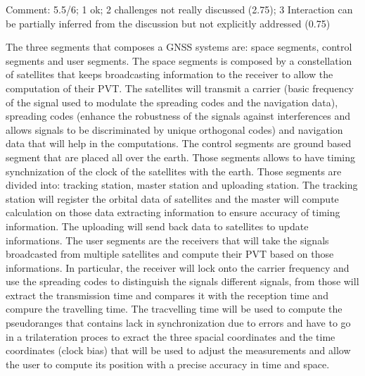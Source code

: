 \begin{solution}
    Comment: 5.5/6; 1 ok; 2 challenges not really discussed (2.75); 3 Interaction can be partially inferred from the discussion but not explicitly addressed (0.75)


    The three segments that composes a GNSS systems are: space segments, control segments and user segments. The space segments is composed by a constellation of satellites that keeps broadcasting information to the receiver to allow the computation of their PVT. The satellites will transmit a carrier (basic frequency of the signal used to modulate the spreading codes and the navigation data), spreading codes (enhance the robustness of the signals against interferences and allows signals to be discriminated by unique orthogonal codes) and navigation data that will help in the computations. The control segments are ground based segment that are placed all over the earth. Those segments allows to have timing synchnization of the clock of the satellites with the earth. Those segments are divided into: tracking station, master station and uploading station. The tracking station will register the orbital data of satellites and the master will compute calculation on those data extracting information to ensure accuracy of timing information. The uploading will send back data to satellites to update informations. The user segments are the receivers that will take the signals broadcasted from multiple satellites and compute their PVT based on those informations. In particular, the receiver will lock onto the carrier frequency and use the spreading codes to distinguish the signals different signals, from those will extract the transmission time and compares it with the reception time and compure the travelling time. The tracvelling time will be used to compute the pseudoranges that contains lack in synchronization due to errors and have to go in a trilateration proces to exract the three spacial coordinates and the time coordinates (clock bias) that will be used to adjust the measurements and allow the user to compute its position with a precise accuracy in time and space.
\end{solution}